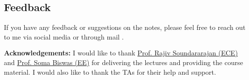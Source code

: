 \documentclass{report}
\begin{document}
\subsection*{Feedback}
If you have any feedback or suggestions on the notes, please feel free to reach out to me via social media or through mail  .

\vfill
{\bf Acknowledgements:} I would like to thank \href{https://ece.iisc.ac.in/~rajivs/#/}{Prof. Rajiv Soundararajan (ECE)} and \href{https://ee.iisc.ac.in/soma-biswas/}{Prof. Soma Biswas (EE)} for delivering the lectures and providing the course material. 
I would also like to thank the TAs for their help and support. 

\tableofcontents
\pagebreak


% 
% 
% 




\end{document}
